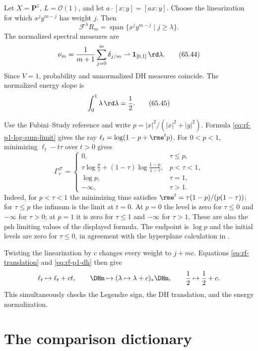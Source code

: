 \begin{example}
\label{ex:rf-p1-complete}
Let $X=\mathbf P^1$, $L=\mathcal O(1)$, and let
$a\cdot[x:y]=[ax:y]$.
Choose the linearization for which
$x^jy^{m-j}$ has weight $j$.
Then
\[
 \mathcal F^\lambda R_m
 =\operatorname{span}\{x^jy^{m-j}\mid j\geq\lambda\}.
\tag{65.43}\label{eq:rf-p1-filtration}
\]
The normalized spectral measures are
\[
 \nu_m=\frac1{m+1}\sum_{j=0}^m\delta_{j/m}
        \rightharpoonup\mathbf 1_{[0,1]}\,\rd \lambda.
\tag{65.44}\label{eq:rf-p1-dh}
\]
Since $V=1$, probability and unnormalized DH measures coincide.
The normalized energy slope is
\[
                 \int_0^1\lambda\,\rd \lambda=\frac12.
\tag{65.45}\label{eq:rf-p1-energy-slope}
\]

Use the Fubini--Study reference and write $p=|x|^2/(|x|^2+|y|^2)$. Formula \eqref{eq:rf-p1-log-sum-limit} gives the ray $\ell_t=\log(1-p+\rme^t p)$. For $0<p<1$, minimizing $\ell_t-t\tau$ over $t>0$ gives
\[
 \Gamma_\tau^{\mathcal F}
 =\begin{cases}
  0,&\tau\leq p,\\
  \displaystyle\tau\log\frac p\tau
       +(1-\tau)\log\frac{1-p}{1-\tau},&p<\tau<1,\\
  \log p,&\tau=1,\\
  -\infty,&\tau>1.
 \end{cases}
\tag{65.45a}\label{eq:rf-p1-inverse-legendre}
\]
Indeed, for $p<\tau<1$ the minimizing time satisfies $\rme^t=\tau(1-p)/(p(1-\tau))$; for $\tau\leq p$ the infimum is the limit at $t=0$. At $p=0$ the level is zero for $\tau\leq0$ and $-\infty$ for $\tau>0$; at $p=1$ it is zero for $\tau\leq1$ and $-\infty$ for $\tau>1$. These are also the psh limiting values of the displayed formula. The endpoint is $\log p$ and the initial levels are zero for $\tau\leq0$, in agreement with the hyperplane calculation in .

\noindent\begin{minipage}{\linewidth}
Twisting the linearization by $c$ changes every weight to $j+mc$.
Equations \eqref{eq:rf-translation} and
\eqref{eq:rf-p1-dh} then give
\[
 \ell_t\mapsto\ell_t+ct,
 \qquad
 \DHm\mapsto(\lambda\mapsto\lambda+c)_*\DHm,
 \qquad
 \frac12\mapsto\frac12+c.
\]
This simultaneously checks the Legendre sign, the DH translation, and the
energy normalization.
\end{minipage}\par
\end{example}

\section{The comparison dictionary}
\label{sec:rf-comparison-dictionary}

